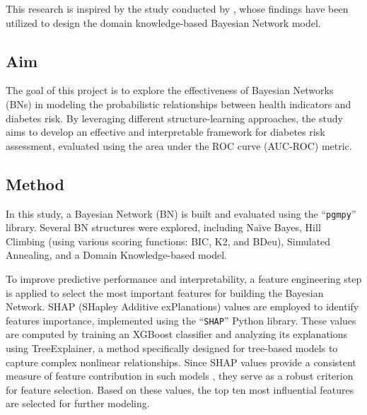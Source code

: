 \documentclass[letterpaper]{article}
\begin{document}
This research is inspired by the study conducted by \citet{kong2024}, whose findings have been utilized to design the domain knowledge-based Bayesian Network model.

\subsection{Aim}

The goal of this project is to explore the effectiveness of Bayesian Networks (BNs) in modeling the probabilistic relationships between health indicators and diabetes risk. By leveraging different structure-learning approaches, the study aims to develop an effective and interpretable framework for diabetes risk assessment, evaluated using the area under the ROC curve (AUC-ROC) metric.

\subsection{Method} 

In this study, a Bayesian Network (BN) is built and evaluated using the ``\texttt{pgmpy}'' library. Several BN structures were explored, including Naïve Bayes, Hill Climbing (using various scoring functions: BIC, K2, and BDeu), Simulated Annealing, and a Domain Knowledge-based model.  


To improve predictive performance and interpretability, a feature engineering step is applied to select the most important features for building the Bayesian Network. SHAP (SHapley Additive exPlanations) values are employed to identify features importance, implemented using the ``\texttt{SHAP}'' Python library. These values are computed by training an XGBoost classifier \citep{XGBoost} and analyzing its explanations using TreeExplainer, a method specifically designed for tree-based models to capture complex nonlinear relationships. Since SHAP values provide a consistent measure of feature contribution in such models \citep{SHAP}, they serve as a robust criterion for feature selection. Based on these values, the top ten most influential features are selected for further modeling.
\end{document}
